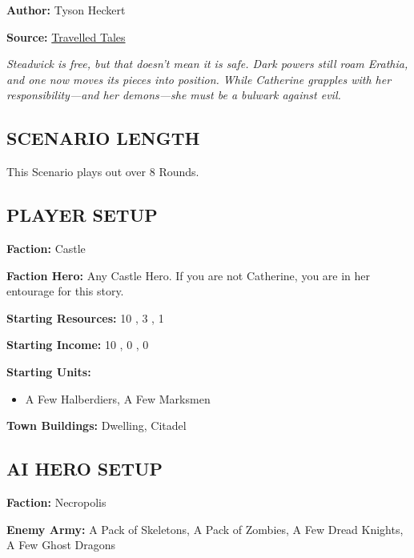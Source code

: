 \cleardoublepage{}

\begin{multicols*}{2}

\textbf{Author:} Tyson Heckert

\textbf{Source:} \href{https://travelledtales.com}{Travelled Tales}

\textit{Steadwick is free, but that doesn't mean it is safe.
Dark powers still roam Erathia, and one now moves its pieces into position.
While Catherine grapples with her responsibility—and her demons—she must be a bulwark against evil.}

\subsection*{\MakeUppercase{Scenario length}}

This Scenario plays out over 8 Rounds.

\subsection*{\MakeUppercase{Player setup}}

\textbf{Faction:} Castle

\textbf{Faction Hero:} Any Castle Hero. If you are not Catherine, you are in her entourage for this story.

\textbf{Starting Resources:} 10 , 3 , 1 

\textbf{Starting Income:} 10 , 0 , 0 

\textbf{Starting Units:}
\begin{itemize}
  \item A Few Halberdiers, A Few Marksmen
\end{itemize}

\textbf{Town Buildings:}  Dwelling, Citadel

\subsection*{\MakeUppercase{AI Hero setup}}

\textbf{Faction:} Necropolis

\textbf{Enemy Army:} A Pack of Skeletons, A Pack of Zombies, A Few Dread Knights, A Few Ghost Dragons


\end{multicols*}
